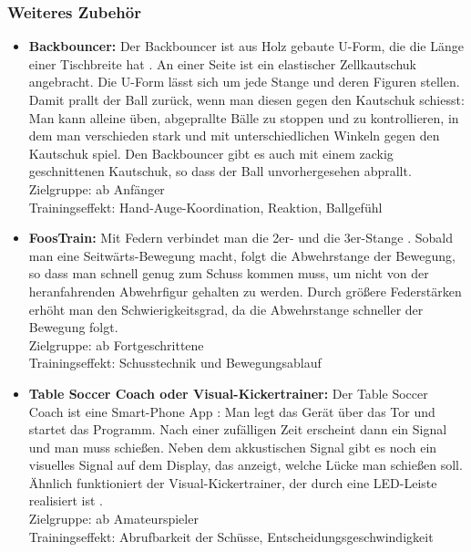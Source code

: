 \subsubsection{Weiteres Zubehör}
\label{tisch:zubehoer:training:weiteres}

\begin{itemize}
\item {\bf Backbouncer:}
Der Backbouncer ist aus Holz gebaute U-Form, die die Länge einer Tischbreite hat \citep{www:kickertrainer}.
An einer Seite ist ein elastischer Zellkautschuk angebracht.
Die U-Form lässt sich um jede Stange und deren Figuren stellen. 
Damit prallt der Ball zurück, wenn man diesen gegen den Kautschuk schiesst: 
Man kann alleine üben, abgeprallte Bälle zu stoppen und zu kontrollieren, in dem man verschieden stark und mit unterschiedlichen Winkeln gegen den Kautschuk spiel. 
Den Backbouncer gibt es auch mit einem zackig geschnittenen Kautschuk, so dass der Ball unvorhergesehen abprallt.  
\\
Zielgruppe: ab Anfänger 
\\
Trainingseffekt: Hand-Auge-Koordination, Reaktion, Ballgefühl
\item {\bf FoosTrain:}
Mit Federn verbindet man die 2er- und die 3er-Stange \citep{www:foostrain}.
Sobald man eine Seitwärts-Bewegung macht, folgt die Abwehrstange der Bewegung, so dass man schnell genug zum Schuss kommen muss, um nicht von der heranfahrenden Abwehrfigur gehalten zu werden.
Durch größere Federstärken erhöht man den Schwierigkeitsgrad, da die Abwehrstange schneller der Bewegung folgt.
\\
Zielgruppe: ab Fortgeschrittene
\\
Trainingseffekt: Schusstechnik und Bewegungsablauf 
\item {\bf Table Soccer Coach oder Visual-Kickertrainer:}
Der Table Soccer Coach ist eine Smart-Phone App \citep{www:tablesoccercoach}:
Man legt das Gerät über das Tor und startet das Programm. 
Nach einer zufälligen Zeit erscheint dann ein Signal und man muss schießen.
Neben dem akkustischen Signal gibt es noch ein visuelles Signal auf dem Display, das anzeigt, welche Lücke man schießen soll.
Ähnlich funktioniert der Visual-Kickertrainer, der durch eine LED-Leiste realisiert ist \citep{www:visualkickertrainer}.
\\
Zielgruppe: ab Amateurspieler 
\\
Trainingseffekt: Abrufbarkeit der Schüsse, Entscheidungsgeschwindigkeit

\end{itemize}
